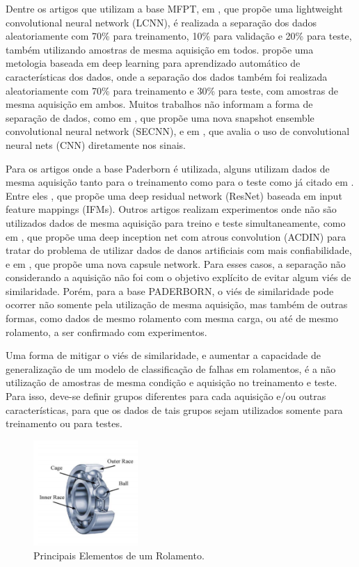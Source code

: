 \documentclass[letterpaper]{article}
\begin{document}
Dentre os artigos que utilizam a base MFPT, em \cite{wang2020bearing}, que propõe uma lightweight convolutional neural network (LCNN), é realizada a separação dos dados aleatoriamente com 70\% para treinamento, 10\% para validação e 20\% para teste, também utilizando amostras de mesma aquisição em todos. \cite{verstraete2017deep} propõe uma metologia baseada em deep learning para aprendizado automático de características dos dados, onde a separação dos dados também foi realizada aleatoriamente com 70\% para treinamento e 30\% para teste, com amostras de mesma aquisição em ambos. Muitos trabalhos não informam a forma de separação de dados, como em \cite{wen2019new}, que propõe uma nova snapshot ensemble convolutional neural network (SECNN), e em \cite{lee2016convolutional}, que avalia o uso de convolutional neural nets (CNN) diretamente nos sinais.

Para os artigos onde a base Paderborn é utilizada, alguns utilizam dados de mesma aquisição tanto para o treinamento como para o teste como já citado em \cite{zhao2020deep}. Entre eles \cite{hou2020input}, que propõe uma deep residual network (ResNet) baseada em input feature mappings (IFMs). Outros artigos realizam experimentos onde não são utilizados dados de mesma aquisição para treino e teste simultaneamente, como em \cite{chen2018acdin}, que propõe uma deep inception net com atrous convolution (ACDIN) para tratar do problema de utilizar dados de danos artificiais com mais confiabilidade, e em \cite{zhu2019convolutional}, que propõe uma nova capsule network. Para esses casos, a separação não considerando a aquisição não foi com o objetivo explícito de evitar algum viés de similaridade. Porém, para a base PADERBORN, o viés de similaridade pode ocorrer não somente pela utilização de mesma aquisição, mas também de outras formas, como dados de mesmo rolamento com mesma carga, ou até de mesmo rolamento, a ser confirmado com experimentos.

Uma forma de mitigar o viés de similaridade, e aumentar a capacidade de generalização de um modelo de classificação de falhas em rolamentos, é a não utilização de amostras de mesma condição e aquisição no treinamento e teste. Para isso, deve-se definir grupos diferentes para cada aquisição e/ou outras características, para que os dados de tais grupos sejam utilizados somente para treinamento ou para testes.


\begin{figure}[H]
    \centering
    \includegraphics[height=40mm]{imagens/rolamento.PNG}
    \caption{Principais Elementos de um Rolamento.}
    \label{fig:rolamento}
\end{figure}
\end{document}
